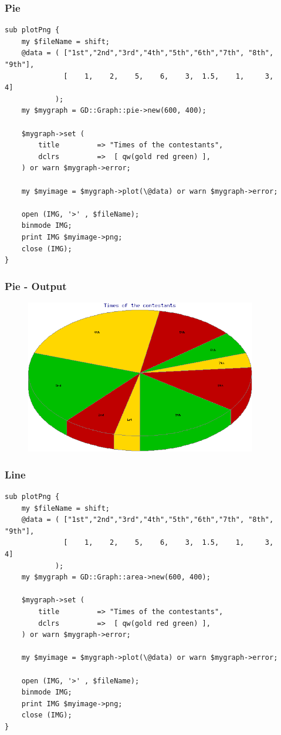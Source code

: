 \documentclass{beamer}
\begin{document}
\begin{frame}[fragile] \frametitle{Pie}
\begin{lstlisting}[language=perl_u,breaklines=true]
sub plotPng {    
    my $fileName = shift;
    @data = ( ["1st","2nd","3rd","4th","5th","6th","7th", "8th", "9th"],
              [    1,    2,    5,    6,    3,  1.5,    1,     3,     4]
            );
    my $mygraph = GD::Graph::pie->new(600, 400);
    
    $mygraph->set (
        title         => "Times of the contestants",
        dclrs         =>  [ qw(gold red green) ],
    ) or warn $mygraph->error;

    my $myimage = $mygraph->plot(\@data) or warn $mygraph->error;
    
    open (IMG, '>' , $fileName);
    binmode IMG;
    print IMG $myimage->png;
    close (IMG);
}
\end{lstlisting}
\end{frame}

\begin{frame} \frametitle{Pie - Output}
\begin{figure}[htbp]
\begin{center}
\includegraphics[width=0.9\textwidth]{image/2.png}
\end{center}
\end{figure}
\end{frame}

\begin{frame}[fragile] \frametitle{Line}
\begin{lstlisting}[language=perl_u,breaklines=true]
sub plotPng {    
    my $fileName = shift;
    @data = ( ["1st","2nd","3rd","4th","5th","6th","7th", "8th", "9th"],
              [    1,    2,    5,    6,    3,  1.5,    1,     3,     4]
            );
    my $mygraph = GD::Graph::area->new(600, 400);
    
    $mygraph->set (
        title         => "Times of the contestants",
        dclrs         =>  [ qw(gold red green) ],
    ) or warn $mygraph->error;

    my $myimage = $mygraph->plot(\@data) or warn $mygraph->error;
    
    open (IMG, '>' , $fileName);
    binmode IMG;
    print IMG $myimage->png;
    close (IMG);
}
\end{lstlisting}
\end{frame}
\end{document}
